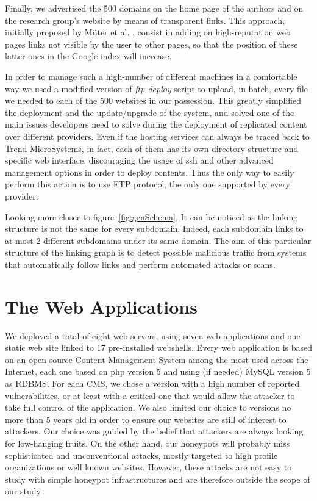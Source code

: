 Finally, we advertised the 500 domains on the home page of the authors and on the research group's website by means of transparent links. This approach, initially proposed by M\"uter et al. \cite{hihat}, consist in adding on high-reputation web pages links not visible by the user to other pages, so that the position of these latter ones in the Google index will increase.

In order to manage such a high-number of different machines in a comfortable way we used a modified version of \emph{ftp-deploy} script to upload, in batch, every file we needed to each of the 500 websites in our possession. This greatly simplified the deployment and the update/upgrade of the system, and solved one of the main issues developers need to solve during the deployment of replicated content over different providers. Even if the hosting services can always be traced back to Trend MicroSystems, in fact, each of them has its own directory structure and specific web interface, discouraging the usage of ssh and other advanced management options in order to deploy contents. Thus the only way to easily perform this action is to use FTP protocol, the only one supported by every provider.

Looking more closer to figure~\ref{fig:genSchema}, It can be noticed as the linking structure is not the same for every subdomain. Indeed, each subdomain links to at most 2 different subdomains under its same domain. The aim of this particular structure of the linking graph is to detect possible malicious traffic from systems that automatically follow links and perform automated attacks or scans.

\section{The Web Applications}
We deployed a total of eight web servers, using seven web applications and one static web site linked to 17 pre-installed webshells. Every web application is based on an open source Content Management System among the most used across the Internet, each one based on php version 5 and using (if needed) MySQL version 5 as RDBMS. For each CMS, we chose a version with a high number of reported vulnerabilities, or at least with a critical one that would allow the attacker to take full control of the application. We also limited our choice to versions no more than 5 years old in order to ensure our websites are still of interest to attackers.
Our choice was guided by the belief that attackers are always looking for low-hanging fruits. On the other hand, our honeypots will probably miss sophisticated and unconventional attacks, mostly targeted to high profile organizations or well known websites. However, these attacks are not easy to study with simple honeypot infrastructures and are therefore outside the scope of our study.

